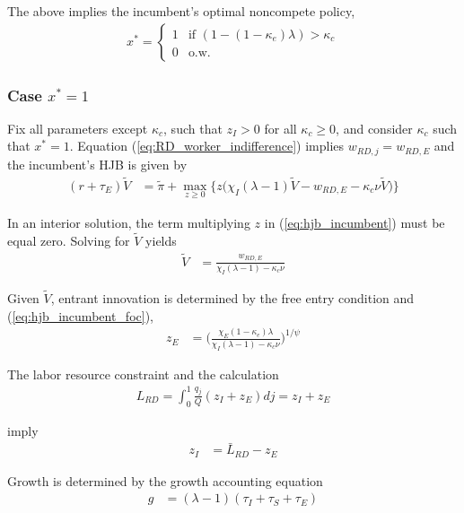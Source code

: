 \documentclass[12pt,english]{article}
\theoremstyle{remark}
\begin{document}
The above implies the incumbent's optimal noncompete policy,
\begin{align}
x^* = \begin{cases}
1 & \textrm{if } (1-(1-\kappa_{e})\lambda) > \kappa_{c}\\
0 & \textrm{o.w.}
\end{cases} \label{eq_nca_policy}
\end{align}


\subsubsection{Case $x^* = 1$}

Fix all parameters except $\kappa_{c}$, such that $z_I > 0$ for all $\kappa_{c} \ge 0$, and consider $\kappa_{c}$ such that $x^* = 1$. Equation (\ref{eq:RD_worker_indifference}) implies $w_{RD,j} = w_{RD,E}$ and the incumbent's HJB is given by 
\begin{align}
(r + \tau_E) \tilde{V} &= \tilde{\pi} + \max_{z \ge 0} \Big\{z \big(\chi_I (\lambda - 1) \tilde{V} - w_{RD,E} - \kappa_{c} \nu \tilde{V}\big) \Big\} \label{eq:hjb_incumbent}
\end{align}

In an interior solution, the term multiplying $z$ in (\ref{eq:hjb_incumbent}) must be equal zero. Solving for $\tilde{V}$ yields
\begin{align}
	\tilde{V} &= \frac{w_{RD,E}}{\chi_I(\lambda - 1) - \kappa_{c} \nu} \label{eq:hjb_incumbent_foc}
\end{align}

Given $\tilde{V}$, entrant innovation is determined by the free entry condition and (\ref{eq:hjb_incumbent_foc}),
\begin{align}
	z_E &= \Big( \frac{\chi_E (1-\kappa_{e}) \lambda}{\chi_I(\lambda-1) - \kappa_c \nu } \Big)^{1/\psi} \label{eq:effort_entrant}
\end{align}

The labor resource constraint and the calculation
\begin{align}
	L_{RD} = \int_0^1 \frac{q_j}{Q} (z_{I} + z_{E}) dj = z_I + z_E
\end{align}
 
imply 
\begin{align}
	z_I &= \bar{L}_{RD} - z_E \label{eq:zI_asFuncZe}
\end{align}

Growth is determined by the growth accounting equation
\begin{align}
g &= (\lambda - 1)(\tau_I + \tau_S + \tau_E) \label{eq:growth_accounting}
\end{align}
\end{document}
